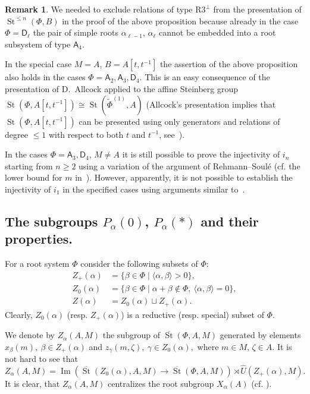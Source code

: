 \documentclass[oneside, 8pt]{amsart}
\theoremstyle{remark}
\theoremstyle{definition}
\numberwithin{lemma}{section}
\numberwithin{prop}{section}
\numberwithin{corollary}{section}
\newtheorem{rem}[lemma]{Remark}
\DeclareMathOperator{\Img}{Im}
\DeclareMathOperator{\St}{St}
\newcommand{\inv}{^{-1}}
\newcommand{\rA}{\mathsf{A}}
\newcommand{\rD}{\mathsf{D}}
\numberwithin{equation}{section}
\begin{document}
\begin{rem}
 We needed to exclude relations of type $\text{R3}^\bot$ from the presentation of $\St^{\leq n}(\Phi, B)$ in the proof of the above proposition because already in the case $\Phi=\rD_\ell$ the pair of simple roots $\alpha_{\ell-1}$, $\alpha_{\ell}$ cannot be embedded into a root subsystem of type $\rA_4$.
 
 In the special case $M=A$, $B = A[t, t\inv]$ the assertion of the above proposition also holds in the cases $\Phi=\rA_2, \rA_3, \rD_4$. This is an easy consequence of the presentation of D.~Allcock applied to the affine Steinberg group $\St(\Phi, A[t, t\inv]) \cong \St(\widetilde{\Phi}^{(1)}, A)$ (Allcock's presentation implies that $\St(\Phi, A[t, t\inv])$ can be presented using only generators and relations of degree $\leq 1$ with respect to both $t$ and $t^{-1}$, see~\cite[Corollary~1.3]{A13}).
 
 In the cases $\Phi = \rA_3, \rD_4$, $M \neq A$ it is still possible to prove the injectivity of $i_n$ starting from $n\geq 2$ using a variation of the argument of Rehmann--Soul{\'e} (cf. the lower bound for $m$ in~\cite[3.2.1]{RS76}). However, apparently, it is not possible to establish the injectivity of $i_1$ in the specified cases using arguments similar to~\cite{RS76}.
\end{rem}


\subsection{The subgroups \texorpdfstring{$P_\alpha(0)$}{Pa(0)}, \texorpdfstring{$P_\alpha(*)$}{Pa(*)} and their properties.} 
For a root system $\Phi$ consider the following subsets of $\Phi$:
\begin{align} Z_+(\alpha) & = \{ \beta \in \Phi \mid \langle \alpha, \beta \rangle > 0 \}, \\
   Z_0(\alpha) & = \{ \beta \in \Phi \mid \alpha + \beta \not\in \Phi,\ \langle \alpha, \beta \rangle = 0 \}, \\
   Z(\alpha)   & = Z_0(\alpha) \sqcup Z_+(\alpha). \end{align} 
Clearly, $Z_0(\alpha)$ (resp. $Z_+(\alpha)$) is a reductive (resp. special) subset of $\Phi$.
   
We denote by $Z_\alpha(A, M)$ the subgroup of $\overline{\St}(\Phi, A, M)$ generated by elements
 $x_{\beta}(m),\ \beta \in Z_+(\alpha)$ and $z_{\gamma}(m, \zeta),\ \gamma \in Z_0(\alpha),$ where $m \in M$, $\zeta \in A$.
It is not hard to see that \[Z_\alpha(A, M) = \Img\left(\overline{\St}(Z_0(\alpha), A, M) \to \overline{\St}(\Phi, A, M)\right) \rtimes \hat{U}(Z_+(\alpha), M). \]
It is clear, that $Z_\alpha(A, M)$ centralizes the root subgroup $X_\alpha(A)$ (cf. \cite[984]{St71}).
\end{document}
